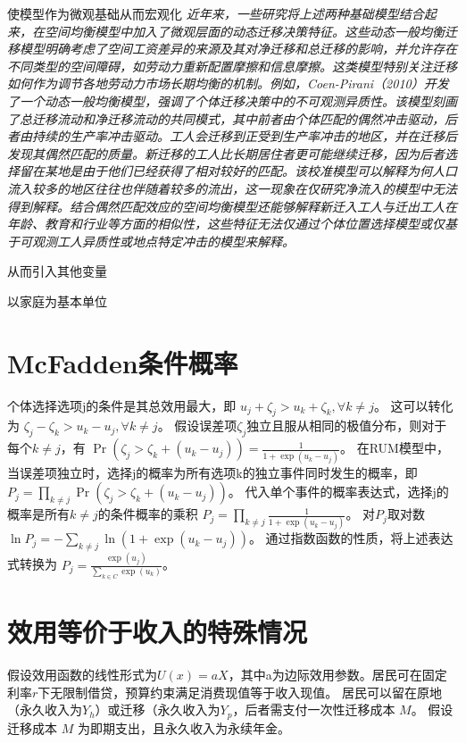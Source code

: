 \documentclass[a4paper,12pt,oneside]{book} %
\begin{document}
使模型作为微观基础从而宏观化
\textit{近年来，一些研究将上述两种基础模型结合起来，在空间均衡模型中加入了微观层面的动态迁移决策特征。这些动态一般均衡迁移模型明确考虑了空间工资差异的来源及其对净迁移和总迁移的影响，并允许存在不同类型的空间障碍，如劳动力重新配置摩擦和信息摩擦。这类模型特别关注迁移如何作为调节各地劳动力市场长期均衡的机制。例如，Coen-Pirani（2010）开发了一个动态一般均衡模型，强调了个体迁移决策中的不可观测异质性。该模型刻画了总迁移流动和净迁移流动的共同模式，其中前者由个体匹配的偶然冲击驱动，后者由持续的生产率冲击驱动。工人会迁移到正受到生产率冲击的地区，并在迁移后发现其偶然匹配的质量。新迁移的工人比长期居住者更可能继续迁移，因为后者选择留在某地是由于他们已经获得了相对较好的匹配。该校准模型可以解释为何人口流入较多的地区往往也伴随着较多的流出，这一现象在仅研究净流入的模型中无法得到解释。结合偶然匹配效应的空间均衡模型还能够解释新迁入工人与迁出工人在年龄、教育和行业等方面的相似性，这些特征无法仅通过个体位置选择模型或仅基于可观测工人异质性或地点特定冲击的模型来解释。}

从而引入其他变量

以家庭为基本单位


\newpage
\appendix

\chapter{McFadden条件概率}

个体选择选项j的条件是其总效用最大，即
$u_j + \zeta_j > u_k + \zeta_k, \forall k \neq j$。
这可以转化为
$\zeta_j - \zeta_k > u_k - u_j, \forall k \neq j$。
假设误差项$\zeta_j$独立且服从相同的极值分布，则对于每个$k \neq j$，有
$\Pr(\zeta_j > \zeta_k + (u_k - u_j)) = \frac{1}{1 + \exp(u_k - u_j)}$。
在RUM模型中，当误差项独立时，选择j的概率为所有选项k的独立事件同时发生的概率，即
$P_j = \prod\limits_{k \neq j} \Pr(\zeta_j > \zeta_k + (u_k - u_j))$。
代入单个事件的概率表达式，选择j的概率是所有$k \neq j$的条件概率的乘积
$P_j = \prod\limits_{k \neq j} \frac{1}{1 + \exp(u_k - u_j)}$。
对$P_j$取对数
$\ln P_j = - \sum_{k \neq j} \ln(1 + \exp(u_k - u_j))$。
通过指数函数的性质，将上述表达式转换为
$P_j = \frac{\exp(u_j)}{\sum\limits_{k \in C} \exp(u_k)}$。

\chapter{效用等价于收入的特殊情况}
假设效用函数的线性形式为$U(x)=a X$，其中a为边际效用参数。居民可在固定利率$r$下无限制借贷，预算约束满足消费现值等于收入现值。
居民可以留在原地（永久收入为$Y_h$）或迁移（永久收入为$Y_p$，后者需支付一次性迁移成本 $M$。
假设迁移成本 
$M$
为即期支出，且永久收入为永续年金。
\end{document}
